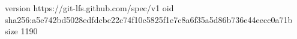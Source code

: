 version https://git-lfs.github.com/spec/v1
oid sha256:a5e742bd5028edfdcbc22c74f10c5825f1e7c8a6f35a5d86b736e44eecc0a71b
size 1190
